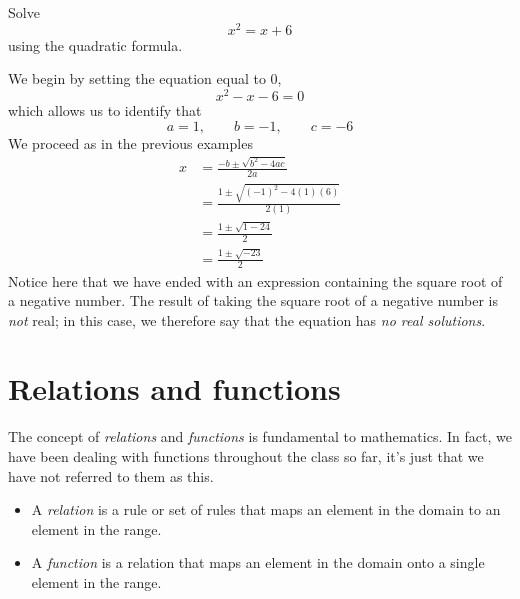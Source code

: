 \begin{myexample}
Solve
\[
	x^2=x+6
\]
using the quadratic formula.
\end{myexample}
\begin{myProof}
	We begin by setting the equation equal to 0,
	\[
		x^2-x-6=0
	\]
	which allows us to identify that
	\[
		a = 1, \qquad b = -1, \qquad c = -6
	\]
	We proceed as in the previous examples
	\begin{align*}
		x & =  \frac{-b\pm \sqrt{b^2-4ac}}{2a}        \\
		  & =  \frac{1\pm\sqrt{(-1)^2-4(1)(6)}}{2(1)} \\
		  & =  \frac{1\pm \sqrt{1-24}}{2}             \\
		  & =  \frac{1\pm\sqrt{-23}}{2}               
	\end{align*}
	{}
	Notice here that we have ended with an \gls{expression} containing the square root of a negative number. 
	The result of taking the square root of a negative number is {\em not } real; in this case, 
	we therefore say that the equation has {\em no real solutions}.
\end{myProof} 

\section{Relations and functions}
%
The concept of {\em relations} and {\em functions} is fundamental to mathematics. In fact, we have
been dealing with functions throughout the class so far, it's just that we have not referred to them as this.
\begin{itemize}
	\item A {\em relation} is a rule or set of rules that maps an element in the 
	domain to an element in the range.
	\item A {\em function} is a relation that maps an element in the domain onto 
	a single element in the range.
\end{itemize} 

\begin{center}
\end{center}

